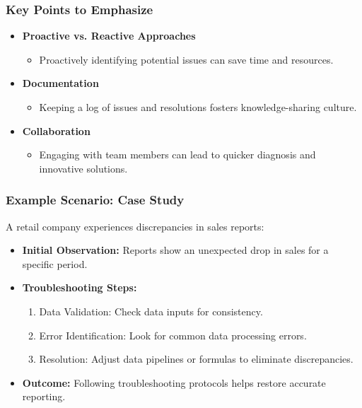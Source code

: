 \documentclass[aspectratio=169]{beamer}
\begin{document}
\begin{frame}[fragile]
    \frametitle{Key Points to Emphasize}
    \begin{itemize}
        \item \textbf{Proactive vs. Reactive Approaches}
            \begin{itemize}
                \item Proactively identifying potential issues can save time and resources.
            \end{itemize}
        \item \textbf{Documentation}
            \begin{itemize}
                \item Keeping a log of issues and resolutions fosters knowledge-sharing culture.
            \end{itemize}
        \item \textbf{Collaboration}
            \begin{itemize}
                \item Engaging with team members can lead to quicker diagnosis and innovative solutions.
            \end{itemize}
    \end{itemize}
\end{frame}

\begin{frame}[fragile]
    \frametitle{Example Scenario: Case Study}
    A retail company experiences discrepancies in sales reports:
    \begin{itemize}
        \item \textbf{Initial Observation:} Reports show an unexpected drop in sales for a specific period.
        \item \textbf{Troubleshooting Steps:}
            \begin{enumerate}
                \item Data Validation: Check data inputs for consistency.
                \item Error Identification: Look for common data processing errors.
                \item Resolution: Adjust data pipelines or formulas to eliminate discrepancies.
            \end{enumerate}
        \item \textbf{Outcome:} Following troubleshooting protocols helps restore accurate reporting.
    \end{itemize}
\end{frame}
\end{document}
